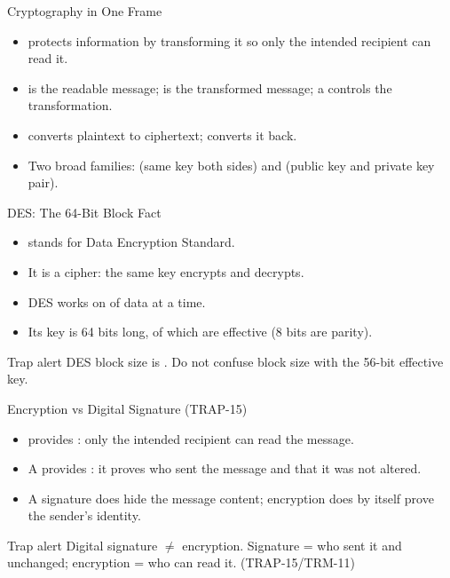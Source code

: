 \documentclass[aspectratio=169]{beamer}
\begin{document}
\begin{frame}{Cryptography in One Frame}
  \begin{itemize}
    \item {} protects information by transforming it so only
      the intended recipient can read it.
    \item {} is the readable message;  is the
      transformed message; a  controls the transformation.
    \item {} converts plaintext to ciphertext;
       converts it back.
    \item Two broad families:  (same key both sides) and
       (public key and private key pair).
  \end{itemize}
\end{frame}

\begin{frame}{DES: The 64-Bit Block Fact}
  \begin{itemize}
    \item {} stands for Data Encryption Standard.
    \item It is a  cipher: the same key encrypts and decrypts.
    \item DES works on  of data at a time.
    \item Its key is 64 bits long, of which  are effective (8
      bits are parity).
  \end{itemize}
  \begin{alertblock}{Trap alert}
    DES block size is . Do not confuse block size with the 56-bit
    effective key.
  \end{alertblock}
\end{frame}

\begin{frame}{Encryption vs Digital Signature (TRAP-15)}
  \begin{itemize}
    \item {} provides : only the intended
      recipient can read the message.
    \item A  provides :
      it proves who sent the message and that it was not altered.
    \item A signature does  hide the message content; encryption
      does  by itself prove the sender's identity.
  \end{itemize}
  \begin{alertblock}{Trap alert}
    Digital signature $\ne$ encryption. Signature = who sent it and unchanged;
    encryption = who can read it. (TRAP-15/TRM-11)
  \end{alertblock}
\end{frame}
\end{document}
